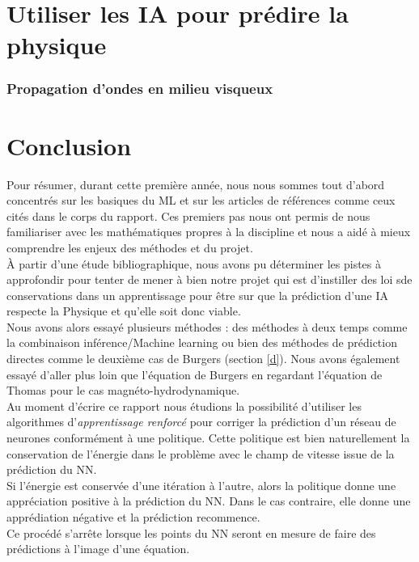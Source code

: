 \documentclass[a4paper,12pt]{article}
\newcommand\bk{\color{black}}
\newcommand\brick{\color{brick}}
\newcommand\navy{\color{navy}}
\numberwithin{equation}{section} %
\begin{document}
\pagebreak

\navy \section{Utiliser les IA pour prédire la physique} \bk
\brick \subsubsection{Propagation d'ondes en milieu visqueux}\bk

\pagebreak

\navy \section{Conclusion} \bk
\noindent Pour résumer, durant cette première année, nous nous sommes tout d'abord concentrés sur les basiques du ML et sur les articles de références comme ceux cités dans le corps du rapport. Ces premiers pas nous ont permis de nous familiariser avec les mathématiques propres à la discipline et nous a aidé à mieux comprendre les enjeux des méthodes et du projet.\\
À partir d'une étude bibliographique, nous avons pu déterminer les pistes à approfondir pour tenter de mener à bien notre projet qui est d'instiller des loi sde conservations dans un apprentissage pour être sur que la prédiction d'une IA respecte la Physique et qu'elle soit donc viable.\\
Nous avons alors essayé plusieurs méthodes : des méthodes à deux temps comme la combinaison inférence/Machine learning ou bien des méthodes de prédiction directes comme le deuxième cas de Burgers (section \eqref{d}). Nous avons également essayé d'aller plus loin que l'équation de Burgers en regardant l'équation de Thomas pour le cas magnéto-hydrodynamique.\\
	
\noindent Au moment d'écrire ce rapport nous étudions la possibilité d'utiliser les algorithmes d'\textit{apprentissage renforcé} pour corriger la prédiction d'un réseau de neurones conformément à une politique. Cette politique est bien naturellement la conservation de l'énergie dans le problème avec le champ de vitesse issue de la prédiction du NN. \\
Si l'énergie est conservée d'une itération à l'autre, alors la politique donne une appréciation positive à la prédiction du NN. Dans le cas contraire, elle donne une apprédiation négative et la prédiction recommence.\\
Ce procédé s'arrête lorsque les points du NN seront en mesure de faire des prédictions à l'image d'une équation.\\




\pagebreak



\end{document}
